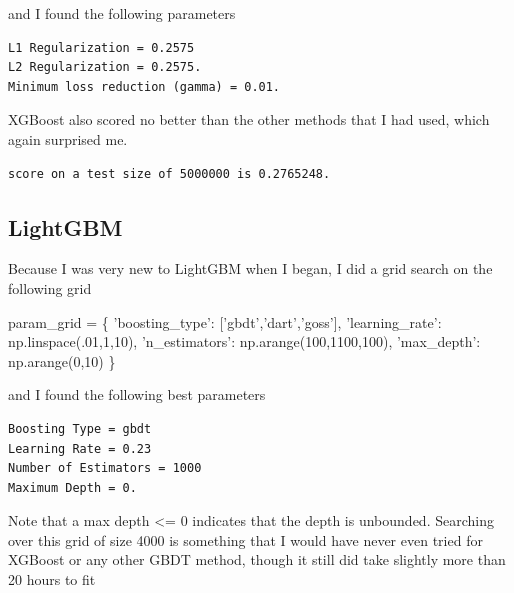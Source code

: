 \documentclass[11pt]{article}
\newenvironment{Shaded}{}{}
\newcommand{\DecValTok}[1]{\textcolor[rgb]{0.25,0.63,0.44}{{#1}}}
\newcommand{\StringTok}[1]{\textcolor[rgb]{0.25,0.44,0.63}{{#1}}}
\newcommand{\NormalTok}[1]{{#1}}
\newcommand{\OperatorTok}[1]{\textcolor[rgb]{0.40,0.40,0.40}{{#1}}}
\begin{document}
and I found the following parameters

    \begin{Verbatim}[commandchars=\\\{\}]
L1 Regularization = 0.2575
L2 Regularization = 0.2575.
Minimum loss reduction (gamma) = 0.01.
    \end{Verbatim}

    XGBoost also scored no better than the other methods that I had used, which again surprised me.

    \begin{Verbatim}[commandchars=\\\{\}]
score on a test size of 5000000 is 0.2765248.
    \end{Verbatim}

    \hypertarget{lightgbm}{%
\subsection{LightGBM}\label{lightgbm}}

Because I was very new to LightGBM when I began, I did a grid search on
the following grid

\begin{Shaded}
\begin{Highlighting}[]
\NormalTok{param_grid }\OperatorTok{=}\NormalTok{ \{}
    \StringTok{'boosting_type'}\NormalTok{: [}\StringTok{'gbdt'}\NormalTok{,}\StringTok{'dart'}\NormalTok{,}\StringTok{'goss'}\NormalTok{],}
    \StringTok{'learning_rate'}\NormalTok{: np.linspace(.}\DecValTok{01}\NormalTok{,}\DecValTok{1}\NormalTok{,}\DecValTok{10}\NormalTok{),}
    \StringTok{'n_estimators'}\NormalTok{: np.arange(}\DecValTok{100}\NormalTok{,}\DecValTok{1100}\NormalTok{,}\DecValTok{100}\NormalTok{),}
    \StringTok{'max_depth'}\NormalTok{: np.arange(}\DecValTok{0}\NormalTok{,}\DecValTok{10}\NormalTok{)}
\NormalTok{\}}
\end{Highlighting}
\end{Shaded}

and I found the following best parameters

    \begin{Verbatim}[commandchars=\\\{\}]
Boosting Type = gbdt
Learning Rate = 0.23
Number of Estimators = 1000
Maximum Depth = 0.
    \end{Verbatim}

    Note that a max depth \textless{}= 0 indicates that the depth is
unbounded. Searching over this grid of size 4000 is something that I
would have never even tried for XGBoost or any other GBDT method, though
it still did take slightly more than 20 hours to fit
\end{document}
